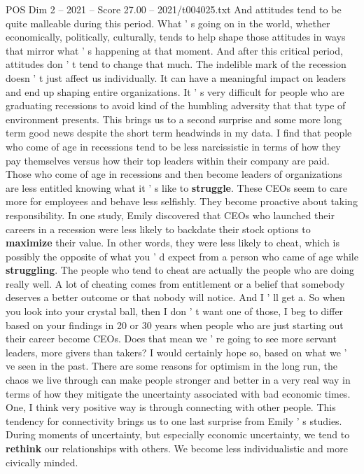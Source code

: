 \begin{textsample}{POS Dim 2 – 2021 – Score 27.00 – 2021/t004025.txt}
And attitudes tend to be quite malleable during this period.
What ' s going on in the world, whether economically, politically, culturally, tends to help shape those attitudes in ways that mirror what ' s happening at that moment.
And after this critical period, attitudes don ' t tend to change that much.
The indelible mark of the recession doesn ' t just affect us individually.
It can have a meaningful impact on leaders and end up shaping entire organizations.
It ' s very difficult for people who are graduating recessions to avoid kind of the humbling adversity that that type of environment presents.
This brings us to a second surprise and some more long term good news despite the short term headwinds in my data.
I find that people who come of age in recessions tend to be less narcissistic in terms of how they pay themselves versus how their top leaders within their company are paid.
Those who come of age in recessions and then become leaders of organizations are less entitled knowing what it ' s like to \textbf{struggle}.
These CEOs seem to care more for employees and behave less selfishly.
They become proactive about taking responsibility.
In one study, Emily discovered that CEOs who launched their careers in a recession were less likely to backdate their stock options to \textbf{maximize} their value.
In other words, they were less likely to cheat, which is possibly the opposite of what you ' d expect from a person who came of age while \textbf{struggling}.
The people who tend to cheat are actually the people who are doing really well.
A lot of cheating comes from entitlement or a belief that somebody deserves a better outcome or that nobody will notice.
And I ' ll get a.
So when you look into your crystal ball, then I don ' t want one of those, I beg to differ based on your findings in 20 or 30 years when people who are just starting out their career become CEOs.
Does that mean we ' re going to see more servant leaders, more givers than takers?
I would certainly hope so, based on what we ' ve seen in the past.
There are some reasons for optimism in the long run, the chaos we live through can make people stronger and better in a very real way in terms of how they mitigate the uncertainty associated with bad economic times.
One, I think very positive way is through connecting with other people.
This tendency for connectivity brings us to one last surprise from Emily ' s studies.
During moments of uncertainty, but especially economic uncertainty, we tend to \textbf{rethink} our relationships with others.
We become less individualistic and more civically minded.

\end{textsample}
